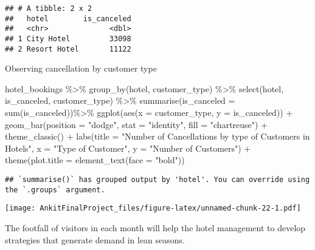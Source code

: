 \documentclass[
]{article}
\newenvironment{Shaded}{\begin{snugshade}}{\end{snugshade}}
\newcommand{\AttributeTok}[1]{\textcolor[rgb]{0.77,0.63,0.00}{#1}}
\newcommand{\FunctionTok}[1]{\textcolor[rgb]{0.00,0.00,0.00}{#1}}
\newcommand{\NormalTok}[1]{#1}
\newcommand{\SpecialCharTok}[1]{\textcolor[rgb]{0.00,0.00,0.00}{#1}}
\newcommand{\StringTok}[1]{\textcolor[rgb]{0.31,0.60,0.02}{#1}}
\begin{document}
\begin{verbatim}
## # A tibble: 2 x 2
##   hotel        is_canceled
##   <chr>              <dbl>
## 1 City Hotel         33098
## 2 Resort Hotel       11122
\end{verbatim}

Observing cancellation by customer type

\begin{Shaded}
\begin{Highlighting}[]
\NormalTok{hotel\_bookings }\SpecialCharTok{\%\textgreater{}\%} \FunctionTok{group\_by}\NormalTok{(hotel, customer\_type) }\SpecialCharTok{\%\textgreater{}\%} \FunctionTok{select}\NormalTok{(hotel, is\_canceled, customer\_type) }\SpecialCharTok{\%\textgreater{}\%} \FunctionTok{summarise}\NormalTok{(}\AttributeTok{is\_canceled =} \FunctionTok{sum}\NormalTok{(is\_canceled))}\SpecialCharTok{\%\textgreater{}\%} \FunctionTok{ggplot}\NormalTok{(}\FunctionTok{aes}\NormalTok{(}\AttributeTok{x =}\NormalTok{ customer\_type, }\AttributeTok{y =}\NormalTok{ is\_canceled)) }\SpecialCharTok{+}
  \FunctionTok{geom\_bar}\NormalTok{(}\AttributeTok{position =} \StringTok{"dodge"}\NormalTok{, }\AttributeTok{stat =} \StringTok{"identity"}\NormalTok{, }\AttributeTok{fill =} \StringTok{"chartreuse"}\NormalTok{) }\SpecialCharTok{+}
  \FunctionTok{theme\_classic}\NormalTok{() }\SpecialCharTok{+}
  \FunctionTok{labs}\NormalTok{(}\AttributeTok{title =} \StringTok{"Number of Cancellations by type of Customers in Hotels"}\NormalTok{, }\AttributeTok{x =} \StringTok{"Type of Customer"}\NormalTok{, }\AttributeTok{y =} \StringTok{"Number of Customers"}\NormalTok{) }\SpecialCharTok{+}
  \FunctionTok{theme}\NormalTok{(}\AttributeTok{plot.title =} \FunctionTok{element\_text}\NormalTok{(}\AttributeTok{face =} \StringTok{"bold"}\NormalTok{))}
\end{Highlighting}
\end{Shaded}

\begin{verbatim}
## `summarise()` has grouped output by 'hotel'. You can override using the `.groups` argument.
\end{verbatim}

\texttt{[image: AnkitFinalProject\_files/figure-latex/unnamed-chunk-22-1.pdf]}

The footfall of visitors in each month will help the hotel management to
develop strategies that generate demand in lean seasons.
\end{document}
